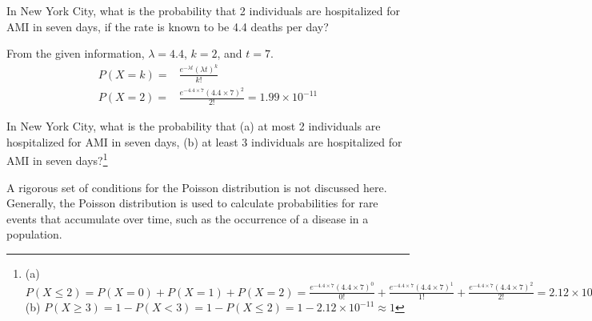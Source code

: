 
\begin{example}{In New York City, what is the probability that 2 individuals are hospitalized for AMI in seven days, if the rate is known to be 4.4 deaths per day?}

From the given information, $\lambda = 4.4$, $k = 2$, and $t = 7$. 
\begin{align*}
P(X = k) =& \frac{e^{-\lambda t}(\lambda t)^{k}}{k!} \\
P(X = 2) =& \frac{e^{-4.4 \times 7}(4.4 \times 7)^{2}}{2!} = 1.99 \times 10^{-11}
\end{align*}
	
\end{example}

\begin{exercise}
In New York City, what is the probability that (a) at most 2 individuals are hospitalized for AMI in seven days, (b) at least 3 individuals are hospitalized for AMI in seven days?\footnote{(a) $P(X \leq 2) = P(X=0) + P(X=1) + P(X=2) = \frac{e^{-4.4 \times 7}(4.4 \times 7)^{0}}{0!} + \frac{e^{-4.4 \times 7}(4.4 \times 7)^{1}}{1!} + \frac{e^{-4.4 \times 7}(4.4 \times 7)^{2}}{2!} = 2.12 \times 10^{-11}$ (b) $P(X \geq 3) = 1 - P(X < 3) = 1 - P(X \leq 2) = 1 - 2.12 \times 10^{-11} \approx 1 $}
\end{exercise}

A rigorous set of conditions for the Poisson distribution is not discussed here. Generally, the Poisson distribution is used to calculate probabilities for rare events that accumulate over time, such as the occurrence of a disease in a population.

